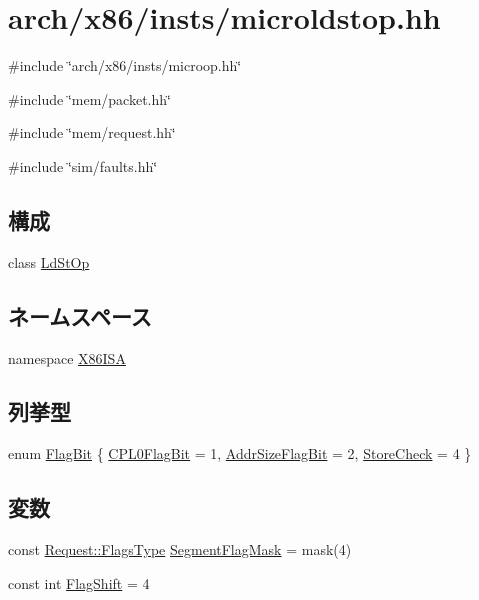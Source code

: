 \hypertarget{microldstop_8hh}{
\section{arch/x86/insts/microldstop.hh}
\label{microldstop_8hh}
}
{\ttfamily \#include \char`\"{}arch/x86/insts/microop.hh\char`\"{}}\par
{\ttfamily \#include \char`\"{}mem/packet.hh\char`\"{}}\par
{\ttfamily \#include \char`\"{}mem/request.hh\char`\"{}}\par
{\ttfamily \#include \char`\"{}sim/faults.hh\char`\"{}}\par
\subsection*{構成}
\begin{DoxyCompactItemize}
\item 
class \hyperlink{classX86ISA_1_1LdStOp}{LdStOp}
\end{DoxyCompactItemize}
\subsection*{ネームスペース}
\begin{DoxyCompactItemize}
\item 
namespace \hyperlink{namespaceX86ISA}{X86ISA}
\end{DoxyCompactItemize}
\subsection*{列挙型}
\begin{DoxyCompactItemize}
\item 
enum \hyperlink{namespaceX86ISA_a90b19ab669542957b0c2b1b5e2187319}{FlagBit} \{ \hyperlink{namespaceX86ISA_a90b19ab669542957b0c2b1b5e2187319ab5daf509b6ab04e3fbb3452ebfc07f8a}{CPL0FlagBit} =  1, 
\hyperlink{namespaceX86ISA_a90b19ab669542957b0c2b1b5e2187319abf51f7fb18e3e6695e45f0308c065067}{AddrSizeFlagBit} =  2, 
\hyperlink{namespaceX86ISA_a90b19ab669542957b0c2b1b5e2187319a9d1043ebef8fbb774d391dc600c9828f}{StoreCheck} =  4
 \}
\end{DoxyCompactItemize}
\subsection*{変数}
\begin{DoxyCompactItemize}
\item 
const \hyperlink{classRequest_a2da503161d95c65aea559dbabcf570aa}{Request::FlagsType} \hyperlink{namespaceX86ISA_a77dc1966203d85366152637f9b44877f}{SegmentFlagMask} = mask(4)
\item 
const int \hyperlink{namespaceX86ISA_aa3993f768fd6f39c79856c9039c7523f}{FlagShift} = 4
\end{DoxyCompactItemize}
